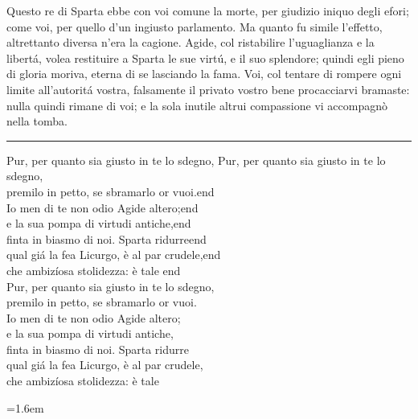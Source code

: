 \documentclass[a5paper,11pt]{book}
\makeatletter
\def\loggingall{
\tracingstats\tw@
\tracingpages\@ne\tracingoutput\@ne
\tracinglostchars\@ne
\tracingparagraphs\@ne\tracingrestores\@ne
\showboxbreadth\maxdimen\showboxdepth\maxdimen}%
\def\testodicontrollo{%
Questo re di Sparta ebbe con voi comune la morte, per giudizio
iniquo degli efori; come voi, per quello d'un ingiusto parlamento.
Ma quanto fu simile l'effetto, altrettanto diversa n'era la
cagione. Agide, col ristabilire l'uguaglianza e la libertá, volea
restituire a Sparta le sue virtú, e il suo splendore; quindi egli
pieno di gloria moriva, eterna di se lasciando la fama. Voi, col
tentare di rompere ogni limite all'autoritá vostra, falsamente il
privato vostro bene procacciarvi bramaste: nulla quindi rimane di
voi; e la sola inutile altrui compassione vi accompagnò nella
tomba.
}
\makeatother
\begin{document}
\loggingall

\shorthandoff{>}
\actname

\testodicontrollo

\noindent\rule{\leftmargini}{1pt}

\begin{versedrama}
  Pur, per quanto sia giusto in te lo sdegno, Pur, per quanto sia giusto in te lo sdegno,\\
  premilo in petto, se sbramarlo or vuoi.end\\
  Io men di te non odio Agide altero;end\\
  e la sua pompa di virtudi antiche,end\\
  finta in biasmo di noi. Sparta ridurreend\\
  qual giá la fea Licurgo, è al par crudele,end\\
  che ambizíosa stolidezza: è tale\hspace{0pt plus 1filll} end\\
  Pur, per quanto sia giusto in te lo sdegno,\\
  premilo in petto, se sbramarlo or vuoi.\\
  Io men di te non odio Agide altero;\\
  e la sua pompa di virtudi antiche,\\
  finta in biasmo di noi. Sparta ridurre\\
  qual giá la fea Licurgo, è al par crudele,\\
  che ambizíosa stolidezza: è tale\\
\end{versedrama}

\leftmargini=1.6em
\end{document}
